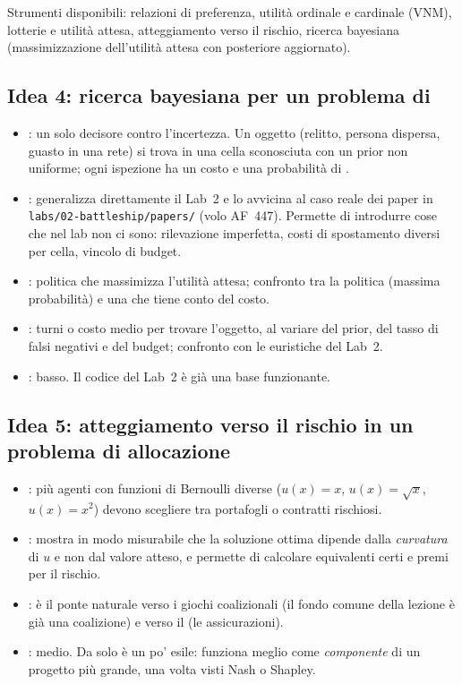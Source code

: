 \documentclass[11pt, a4paper, oneside, openany]{book}
\newcommand{\stato}[2]{\etichetta{#1}{#2}}
\newcommand{\sbloccata}[1]{\stato{blu}{DA LEZIONE #1}}
\begin{document}
Strumenti disponibili: relazioni di preferenza, utilità ordinale e cardinale (VNM),
lotterie e utilità attesa, atteggiamento verso il rischio, ricerca bayesiana
(massimizzazione dell'utilità attesa con posteriore aggiornato).

\subsection*{Idea 4: ricerca bayesiana per un problema di  \hfill\sbloccata{2}}
\begin{itemize}
  \item {}: un solo decisore contro l'incertezza. Un oggetto (relitto, persona
        dispersa, guasto in una rete) si trova in una cella sconosciuta con un prior non
        uniforme; ogni ispezione ha un costo e una probabilità di .
  \item {}: generalizza direttamente il Lab~2 e lo avvicina al caso
        reale dei paper in \texttt{labs/02-battleship/papers/} (volo AF~447). Permette di
        introdurre cose
        che nel lab non ci sono: rilevazione imperfetta, costi di spostamento diversi per
        cella, vincolo di budget.
  \item {}: politica che massimizza l'utilità attesa; confronto tra
        la politica  (massima probabilità) e una che tiene conto del costo.
  \item {}: turni o costo medio per trovare l'oggetto, al variare del prior,
        del tasso di falsi negativi e del budget; confronto con le euristiche del Lab~2.
  \item {}: basso. Il codice del Lab~2 è già una base funzionante.
\end{itemize}

\subsection*{Idea 5: atteggiamento verso il rischio in un problema di allocazione \hfill\sbloccata{2}}
\begin{itemize}
  \item {}: più agenti con funzioni di Bernoulli diverse ($u(x)=x$, $u(x)=\sqrt{x}$,
        $u(x)=x^2$) devono scegliere tra portafogli o contratti rischiosi.
  \item {}: mostra in modo misurabile che la soluzione ottima dipende
        dalla \emph{curvatura} di $u$ e non dal valore atteso, e permette di calcolare
        equivalenti certi e premi per il rischio.
  \item {}: è il ponte naturale verso i giochi coalizionali (il fondo comune
        della lezione è già una coalizione) e verso il  (le assicurazioni).
  \item {}: medio. Da solo è un po' esile: funziona meglio come \emph{componente}
        di un progetto più grande, una volta visti Nash o Shapley.
\end{itemize}
\end{document}
